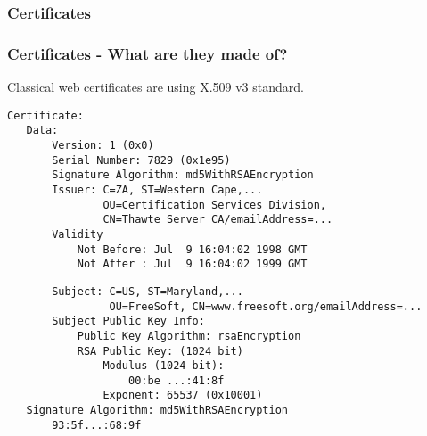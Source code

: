 \begin{frame}
\frametitle{Certificates}
\end{frame}

\begin{frame}[fragile]
\frametitle{Certificates - What are they made of?}
Classical web certificates are using X.509 v3 standard.
\begin{lstlisting}
Certificate:
   Data:
       Version: 1 (0x0)
       Serial Number: 7829 (0x1e95)
       Signature Algorithm: md5WithRSAEncryption
       Issuer: C=ZA, ST=Western Cape,...
               OU=Certification Services Division,
               CN=Thawte Server CA/emailAddress=...
       Validity
           Not Before: Jul  9 16:04:02 1998 GMT
           Not After : Jul  9 16:04:02 1999 GMT
\end{lstlisting}
\end{frame}

\begin{frame}[fragile]
\begin{lstlisting}
       Subject: C=US, ST=Maryland,...
                OU=FreeSoft, CN=www.freesoft.org/emailAddress=...
       Subject Public Key Info:
           Public Key Algorithm: rsaEncryption
           RSA Public Key: (1024 bit)
               Modulus (1024 bit):
                   00:be ...:41:8f
               Exponent: 65537 (0x10001)
   Signature Algorithm: md5WithRSAEncryption
       93:5f...:68:9f
\end{lstlisting}
\end{frame}


